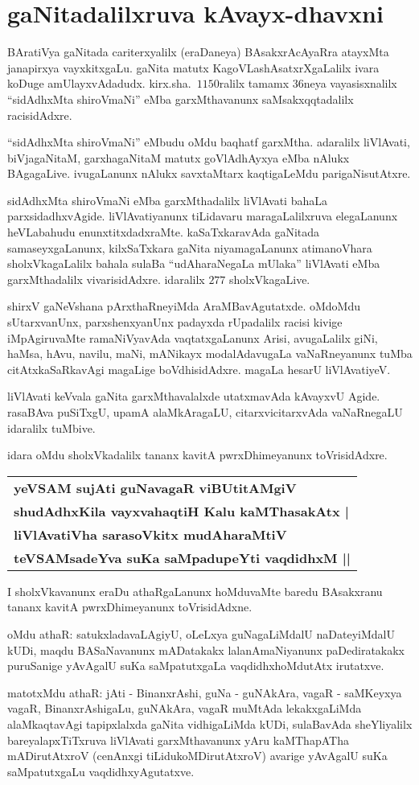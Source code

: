 \chapter{gaNitadalilxruva kAvayx-dhavxni}\label{chap13}

BAratiVya gaNitada cariterxyalilx (eraDaneya) BAsakxrAcAyaRra atayxMta janapirxya vayxkitxgaLu. gaNita matutx KagoVLashAsatxrXgaLalilx ivara koDuge amUlayxvAdadudx. kirx.sha.\ $1150$ralilx tamamx $36$neya vayasisxnalilx ``sidAdhxMta shiroVmaNi'' eMba garxMthavanunx saMsakxqqtadalilx racisidAdxre.

``sidAdhxMta shiroVmaNi'' eMbudu oMdu baqhatf garxMtha. adaralilx liVlAvati, biVjagaNitaM, garxhagaNitaM matutx goVlAdhAyxya eMba nAlukx BAgagaLive. ivugaLanunx nAlukx savxtaMtarx kaqtigaLeMdu parigaNisutAtxre.

sidAdhxMta shiroVmaNi eMba garxMthadalilx liVlAvati bahaLa parxsidadhxvAgide. liVlAvatiyanunx tiLidavaru maragaLalilxruva elegaLanunx heVLabahudu enunxtitxdadxraMte. kaSaTxkaravAda gaNitada samaseyxgaLanunx, kilxSaTxkara gaNita niyamagaLanunx atimanoVhara sholxVkagaLalilx bahala sulaBa ``udAharaNegaLa mUlaka'' liVlAvati eMba garxMthadalilx vivarisidAdxre. idaralilx $277$ sholxVkagaLive.

shirxV gaNeVshana pArxthaRneyiMda AraMBavAgutatxde. oMdoMdu sUtarxvanUnx, parxshenxyanUnx padayxda rUpadalilx racisi kivige iMpAgiruvaMte ramaNiVyavAda vaqtatxgaLanunx Arisi, avugaLalilx giNi, haMsa, hAvu, navilu, maNi, mANikayx modalAdavugaLa vaNaRneyanunx tuMba citAtxkaSaRkavAgi magaLige boVdhisidAdxre. magaLa hesarU liVlAvatiyeV.

liVlAvati keVvala gaNita garxMthavalalxde utatxmavAda kAvayxvU Agide. rasaBAva puSiTxgU, upamA alaMkAragaLU, citarxvicitarxvAda vaNaRnegaLU idaralilx tuMbive.

idara oMdu sholxVkadalilx tananx kavitA pwrxDhimeyanunx toVrisidAdxre.
\begin{center}
\begin{tabular}{l}
{\bf yeVSAM sujAti guNavagaR viBUtitAMgiV}\\
{\bf shudAdhxKila vayxvahaqtiH Kalu kaMThasakAtx |}\\
{\bf liVlAvatiVha sarasoVkitx mudAharaMtiV}\\
{\bf teVSAMsadeYva suKa saMpadupeYti vaqdidhxM ||}
\end{tabular}
\end{center}

I sholxVkavanunx eraDu athaRgaLanunx hoMduvaMte baredu BAsakxranu tananx kavitA pwrxDhimeyanunx toVrisidAdxne.

oMdu athaR: satukxladavaLAgiyU, oLeLxya guNagaLiMdalU naDateyiMdalU kUDi, maqdu BASaNavanunx mADatakakx lalanAmaNiyanunx paDediratakakx puruSanige yAvAgalU suKa saMpatutxgaLa vaqdidhxhoMdutAtx irutatxve.

matotxMdu athaR: jAti - BinanxrAshi, guNa - guNAkAra, vagaR - saMKeyxya vagaR, BinanxrAshigaLu, guNAkAra, vagaR muMtAda lekakxgaLiMda alaMkaqtavAgi tapipxlalxda gaNita vidhigaLiMda kUDi, sulaBavAda sheYliyalilx bareyalapxTiTxruva liVlAvati garxMthavanunx yAru kaMThapATha mADirutAtxroV (cenAnxgi tiLidukoMDirutAtxroV) avarige yAvAgalU suKa saMpatutxgaLu vaqdidhxyAgutatxve.



